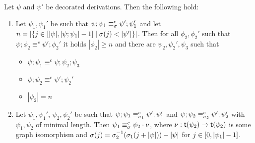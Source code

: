 \begin{lemma}
  \label{le:prop-c}
  Let $\psi$ and $\psi'$ be decorated derivations. Then the following hold:
  \begin{enumerate}
  \item
    \label{le:prop-c:1}
    Let $\psi_1, \psi_1'$ be such
    that $\psi;\psi_1 \equiv^c_{\perm} \psi';\psi_1'$ and let
    $n = | \{ j \in \interval[|\psi|]{|\psi;\psi_1|-1} \mid \perm(j)
    < |\psi'| \}|$. Then for all $\phi_2, \phi_2'$ such that
    $\psi;\phi_2 \equiv^c \psi';\phi_2'$ it holds $|\phi_2| \geq n$
    and there are $\psi_2, \psi_2',\psi_3$ such that

    \begin{itemize}
    \item $\psi;\psi_1 \equiv^c \psi;\psi_2;\psi_3$
    \item $\psi;\psi_2 \equiv^c \psi';\psi_2'$
      
    \item $|\psi_2| = n$
    
    \end{itemize}

  \item
    \label{le:prop-c:2}
    Let $\psi_1, \psi_1'$, $\psi_2, \psi_2'$ be such that
    $\psi;\psi_1 \equiv^c_{\perm_1} \psi';\psi_1'$ and
    $\psi;\psi_2 \equiv^c_{\perm_2} \psi';\psi_2'$ with $\psi_1, \psi_2$
    of minimal length. Then $\psi_1 \equiv^c_\perm \psi_2 \cdot \nu$,
    where $\nu : \target{\psi_2} \to \target{\psi_2}$ is some graph isomorphism and
    $\perm(j) = \perm_2^{-1}(\perm_1(j + |\psi|))-|\psi|$ for
    $j \in \interval[0]{|\psi_1|-1}$.    
  \end{enumerate}
\end{lemma}  

